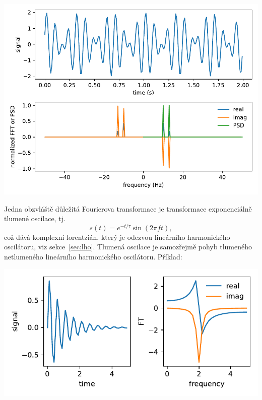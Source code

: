 
\begin{center}
    \includegraphics[width=0.5\linewidth]{fouriers.pdf}
\end{center}



Jedna obzvláště důležitá Fourierova transformace je transformace exponenciálně tlumené oscilace, tj.
\begin{equation}
    s(t) = e^{-t/\tau}\sin(2\pi f t),
\end{equation}
což dává komplexní lorentzián, který je odezvou lineárního harmonického oscilátoru, viz sekce~\ref{sec:lho}. Tlumená oscilace je samozřejmě pohyb tlumeného netlumeného lineárního harmonického oscilátoru. Příklad:

\begin{center}
    \includegraphics{decaying_exponential.pdf}
\end{center}

